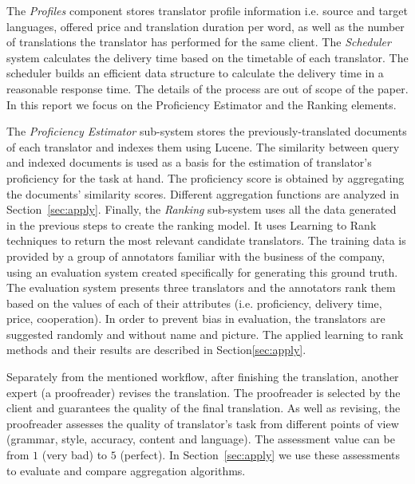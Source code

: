 The \textit{Profiles} component stores translator profile information i.e. source and target languages, offered price and translation duration per word, as well as the number of translations the translator has performed for the same client. The \textit{Scheduler} system calculates the delivery time based on the timetable of each translator. The scheduler builds an efficient data structure to calculate the delivery time in a reasonable response time. The details of the process are out of scope of the paper. In this report we focus on the Proficiency Estimator and the Ranking elements. 

The \textit{Proficiency Estimator} sub-system stores the previously-translated documents of each translator and indexes them using Lucene. The similarity between query and indexed documents is used as a basis for the estimation of translator's proficiency for the task at hand. The proficiency score is obtained by aggregating the documents' similarity scores. Different aggregation functions are analyzed in Section~\ref{sec:apply}. Finally, the \textit{Ranking} sub-system uses all the data generated in the previous steps to create the ranking model. It uses Learning to Rank techniques to return the most relevant candidate translators. The training data is provided by a group of annotators  familiar with the business of the company, using an evaluation system created specifically for generating this ground truth. The evaluation system presents three translators and the annotators rank them based on the values of each of their attributes (i.e. proficiency, delivery time, price, cooperation). In order to prevent bias in evaluation, the translators are suggested randomly and without name and picture. The applied learning to rank methods and their results are described in Section\ref{sec:apply}. 


Separately from the mentioned workflow, after finishing the translation, another expert (a  proofreader) revises the translation. The proofreader is selected by the client and guarantees the quality of the final translation. As well as revising, the proofreader assesses the quality of translator's task from different points of view (grammar, style, accuracy, content and language). The assessment value can be from $1$ (very bad) to $5$ (perfect). In Section~\ref{sec:apply} we use these assessments to evaluate and compare aggregation algorithms.
